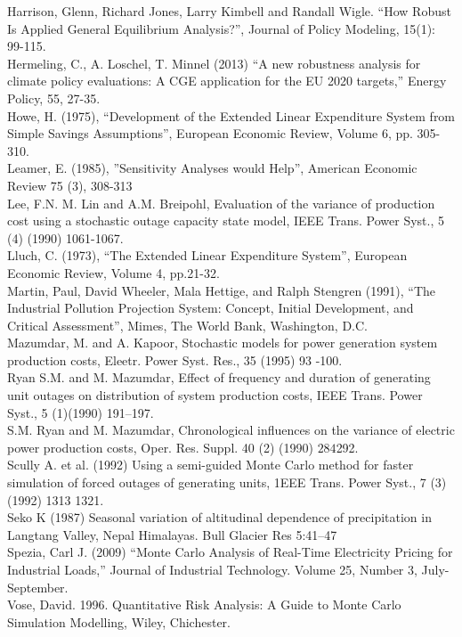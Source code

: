 \documentclass[12pt]{article}
\begin{document}
Harrison, Glenn, Richard Jones, Larry Kimbell and Randall Wigle. “How Robust Is Applied General Equilibrium Analysis?”, Journal of Policy Modeling, 15(1): 99-115. \\
Hermeling, C., A. Loschel, T. Minnel (2013) “A new robustness analysis for climate policy evaluations: A CGE application for the EU 2020 targets,” Energy Policy, 55, 27-35. \\
Howe, H. (1975), “Development of the Extended Linear Expenditure System from Simple Savings Assumptions”, European Economic Review, Volume 6, pp. 305-310. \\
Leamer, E. (1985), ”Sensitivity Analyses would Help”, American Economic Review 75 (3), 308-313  \\
Lee, F.N.  M. Lin and A.M. Breipohl, Evaluation of the variance of production cost using a stochastic outage capacity state model, IEEE Trans. Power Syst., 5 (4) (1990) 1061-1067. \\
Lluch, C. (1973), “The Extended Linear Expenditure System”, European Economic Review, Volume 4, pp.21-32.\\
Martin, Paul, David Wheeler, Mala Hettige, and Ralph Stengren (1991), “The Industrial Pollution Projection System: Concept, Initial Development, and Critical Assessment”, Mimes, The World Bank, Washington, D.C. \\
Mazumdar, M.  and A. Kapoor, Stochastic models for power generation system production costs, Eleetr. Power Syst. Res., 35 (1995) 93 -100. \\
Ryan S.M.  and M. Mazumdar, Effect of frequency and duration of generating unit outages on distribution of system production costs, IEEE Trans. Power Syst., 5 (1)(1990) 191--197. \\
S.M. Ryan and M. Mazumdar, Chronological influences on the variance of electric power production costs, Oper. Res. Suppl. 40 (2) (1990) $284 $292. \\
Scully A.  et al. (1992) Using a semi-guided Monte Carlo method for faster simulation of forced outages of generating units, 1EEE Trans. Power Syst., 7 (3) (1992) 1313 1321. \\
Seko K (1987) Seasonal variation of altitudinal dependence of precipitation in Langtang Valley, Nepal Himalayas. Bull Glacier Res 5:41–47 \\
Spezia, Carl J. (2009) “Monte Carlo Analysis of Real-Time Electricity Pricing for Industrial Loads,” Journal of Industrial Technology. Volume 25, Number 3, July-September. \\
Vose, David. 1996. Quantitative Risk Analysis: A Guide to Monte Carlo Simulation Modelling, Wiley, Chichester.

\end{document}
